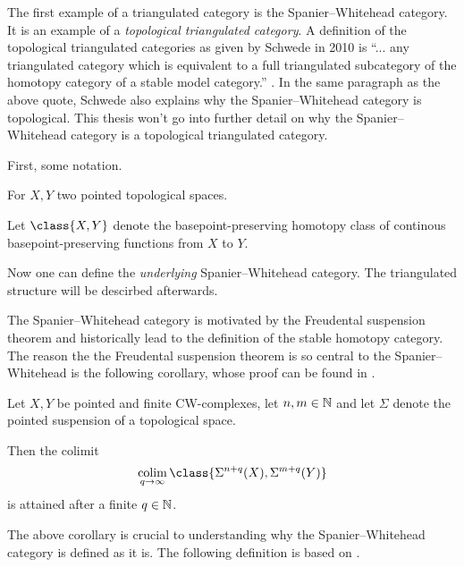 The first example of a triangulated category is the Spanier--Whitehead category. It is an example of a \emph{topological triangulated category}. A definition of the topological triangulated categories as given by Schwede in 2010 is ``... any triangulated category which is equivalent to a full triangulated subcategory of the homotopy category of a stable model category.'' \cite[At the top of p. 6 in the standalone article]{Schwede_2010}. In the same paragraph as the above quote, Schwede also explains why the Spanier--Whitehead category is topological. This thesis won't go into further detail on why the Spanier--Whitehead category is a topological triangulated category.

First, some notation.
\begin{notation}
    For \( X, Y \) two pointed topological spaces.

    Let \( \class{ X, Y } \) denote the basepoint-preserving homotopy class of continous basepoint-preserving functions from \( X \) to \( Y \).
\end{notation}

Now one can define the \emph{underlying} Spanier--Whitehead category. The triangulated structure will be descirbed afterwards.

The Spanier--Whitehead category is motivated by the Freudental suspension theorem and historically lead to the definition of the stable homotopy category. The reason the the Freudental suspension theorem is so central to the Spanier--Whitehead is the following corollary, whose proof can be found in \cite[Remark 5.2]{Daria_Bachelor}.

\begin{corollary}
    \label{cor:sw_freudenthal_suspension}
    Let \( X, Y \) be pointed and finite CW-complexes, let \( n, m \in {\mathbb{N}} \) and let \( \Sigma \) denote the pointed suspension of a topological space.
    
    Then the colimit
    \[
        \colim_{q \to \infty} \class{ \Sigma^{n + q}(X), \Sigma^{m + q}(Y) }
    \]
    is attained after a finite \( q \in {\mathbb{N}} \).
\end{corollary}

The above corollary is crucial to understanding why the Spanier--Whitehead category is defined as it is. The following definition is based on \cite[Definition 2]{Schwede_2010}.

